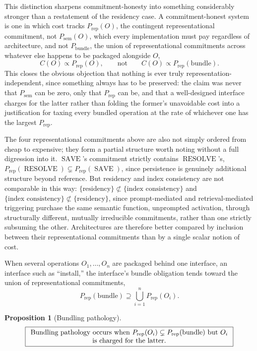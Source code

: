 \documentclass[11pt]{article}
\newtheorem{proposition}{Proposition}
\begin{document}
This distinction sharpens commitment-honesty into something considerably stronger than a restatement of the residency case. A commitment-honest system is one in which cost tracks $P_{\text{rep}}(O)$, the contingent representational commitment, not $P_{\text{sem}}(O)$, which every implementation must pay regardless of architecture, and not $P_{\text{bundle}}$, the union of representational commitments across whatever else happens to be packaged alongside $O$,
\[
C(O) \propto P_{\text{rep}}(O), \qquad \text{not} \qquad C(O) \propto P_{\text{rep}}(\text{bundle}).
\]
This closes the obvious objection that nothing is ever truly representation-independent, since something always has to be preserved: the claim was never that $P_{\text{sem}}$ can be zero, only that $P_{\text{rep}}$ can be, and that a well-designed interface charges for the latter rather than folding the former's unavoidable cost into a justification for taxing every bundled operation at the rate of whichever one has the largest $P_{\text{rep}}$.

The four representational commitments above are also not simply ordered from cheap to expensive; they form a partial structure worth noting without a full digression into it. $\operatorname{SAVE}$'s commitment strictly contains $\operatorname{RESOLVE}$'s, $P_{\text{rep}}(\operatorname{RESOLVE}) \subsetneq P_{\text{rep}}(\operatorname{SAVE})$, since persistence is genuinely additional structure beyond reference. But residency and index consistency are not comparable in this way: $\{\text{residency}\} \not\subset \{\text{index consistency}\}$ and $\{\text{index consistency}\} \not\subset \{\text{residency}\}$, since prompt-mediated and retrieval-mediated triggering purchase the same semantic function, unprompted activation, through structurally different, mutually irreducible commitments, rather than one strictly subsuming the other. Architectures are therefore better compared by inclusion between their representational commitments than by a single scalar notion of cost.

When several operations $O_1, \ldots, O_n$ are packaged behind one interface, an interface such as ``install,'' the interface's bundle obligation tends toward the union of representational commitments,
\[
P_{\text{rep}}(\text{bundle}) \supseteq \bigcup_{i=1}^{n} P_{\text{rep}}(O_i).
\]

\begin{proposition}[Bundling pathology]
\[
\boxed{\begin{minipage}{0.85\textwidth}\centering Bundling pathology occurs when $P_{\text{rep}}(O_i) \subsetneq P_{\text{rep}}(\text{bundle})$ but $O_i$ is charged for the latter.\end{minipage}}
\]
\end{proposition}
\end{document}
